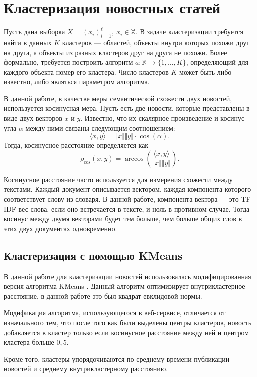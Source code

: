 \documentclass[a4paper, 14pt]{extarticle}
\begin{document}
\section{Кластеризация новостных статей}
Пусть дана выборка $X = (x_i)_{i=1}^{\ell}, \ x_i \in \mathbb{X}$. В задаче кластеризации требуется найти в данных
$K$ кластеров --- областей, объекты внутри которых похожи друг на друга, а объекты из разных кластеров друг на друга не похожи.
Более формально, требуется построить алгоритм $a : \mathbb{X} \to \{1, \dots, K\}$, определяющий для каждого объекта номер его кластера.
Число кластеров $K$ может быть либо известно, либо являться параметром алгоритма.

В данной работе, в качестве меры семантической схожести двух новостей, используется косинусная мера.
Пусть есть две новости, которые представлены в виде двух векторов $x$ и $y$. Известно, что их скалярное произведение
и косинус угла $\alpha$ между ними связаны следующим соотношением:
$$
\langle x,y \rangle = \Vert x \Vert \Vert y \Vert \cdot \cos(\alpha).
$$
Тогда, косинусное расстояние определяется как
$$
\rho_{\cos}(x, y) = \arccos\left(\frac{\langle x,y \rangle}{\Vert x \Vert \Vert y \Vert} \right).
$$

Косинусное расстояние часто используется для измерения схожести между текстами.
Каждый документ описывается вектором, каждая компонента которого соответствует слову из словаря. В данной работе, компонента
вектора --- это TF-IDF вес слова, если оно встречается в тексте, и ноль в противном случае.
Тогда косинус между двумя векторами будет тем больше, чем больше общих слов в этих двух документах одновременно.

\subsection{Кластеризация с помощью KMeans}
В данной работе для кластеризации новостей использовалась модифицированная версия алгоритма KMeans \cite{macqueen1967}. Данный алгоритм 
оптимизирует внутрикластерное расстояние, в данной работе это был квадрат евклидовой нормы.

Модификация алгоритма, использующегося в веб-сервисе, отличается от изначального тем, что после того как были выделены центры кластеров,
новость добавляется в кластер только если косинусное расстояние между ней и центром кластера больше $0,5$.

Кроме того, кластеры упорядочиваются по среднему времени публикации новостей и среднему внутрикластерному расстоянию.
\end{document}
